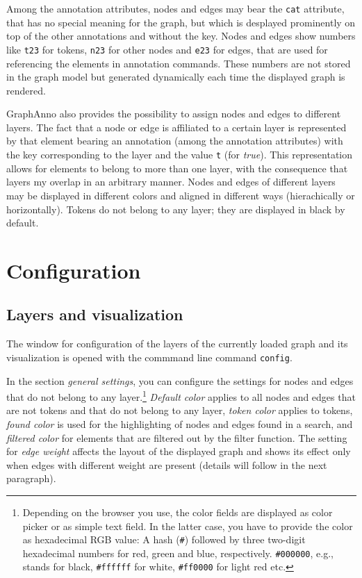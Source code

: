 \documentclass[12pt]{scrartcl}
\begin{document}
Among the annotation attributes, nodes and edges may bear the \texttt{cat} attribute, that has no special meaning for the graph, but which is desplayed prominently on top of the other annotations and without the key.
Nodes and edges show numbers like \texttt{t23} for tokens, \texttt{n23} for other nodes and \texttt{e23} for edges, that are used for referencing the elements in annotation commands.
These numbers are not stored in the graph model but generated dynamically each time the displayed graph is rendered.

GraphAnno also provides the possibility to assign nodes and edges to different layers.
The fact that a node or edge is affiliated to a certain layer is represented by that element bearing an annotation (among the annotation attributes) with the key corresponding to the layer and the value \texttt{t} (for \textit{true}).
This representation allows for elements to belong to more than one layer, with the consequence that layers my overlap in an arbitrary manner.
Nodes and edges of different layers may be displayed in different colors and aligned in different ways (hierachically or horizontally).
Tokens do not belong to any layer; they are displayed in black by default.



\section{Configuration}\label{konfiguration}

\subsection{Layers and visualization}\label{ebenenkonfiguration}

The window for configuration of the layers of the currently loaded graph and its visualization is opened with the commmand line command \texttt{config}.

In the section \textit{general settings}, you can configure the settings for nodes and edges that do not belong to any layer.\footnote{Depending on the browser you use, the color fields are displayed as color picker or as simple text field. In the latter case, you have to provide the color as hexadecimal RGB value: A hash (\texttt{\#}) followed by three two-digit hexadecimal numbers for red, green and blue, respectively. \texttt{\#000000}, e.g., stands for black, \texttt{\#ffffff} for white, \texttt{\#ff0000} for light red etc.}
\textit{Default color} applies to all nodes and edges that are not tokens and that do not belong to any layer, \textit{token color} applies to tokens, \textit{found color} is used for the highlighting of nodes and edges found in a search, and \textit{filtered color} for elements that are filtered out by the filter function.
The setting for \textit{edge weight} affects the layout of the displayed graph and shows its effect only when edges with different weight are present (details will follow in the next paragraph).
\end{document}
